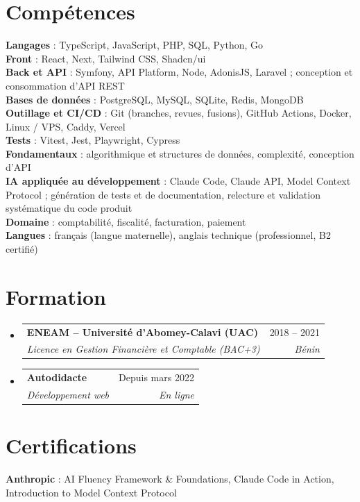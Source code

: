 \documentclass[a4paper,11pt]{article}
\makeatletter
\newlength{\entrygap}
\newlength{\headgap}
\newcommand{\resumeSubheading}[4]{
    \vspace{\entrygap}\item
    \begin{tabular*}{0.97\textwidth}[t]{l@{\extracolsep{\fill}}r}
        \textbf{#1} & #2 \\
        \textit{\small#3} & \textit{\small #4} \\
    \end{tabular*}\vspace{\headgap}
}
\newcommand{\resumeSubHeadingListStart}{\begin{itemize}[leftmargin=0.15in, label={}]}
\newcommand{\resumeSubHeadingListEnd}{\end{itemize}}
\makeatother
\begin{document}
\section{Compétences}
\begin{itemize}[leftmargin=0.15in, label={}]
    \small{\item{
        \textbf{Langages}{ : TypeScript, JavaScript, PHP, SQL, Python, Go} \\
        \textbf{Front}{ : React, Next, Tailwind CSS, Shadcn/ui} \\
        \textbf{Back et API}{ : Symfony, API Platform, Node, AdonisJS, Laravel ; conception et consommation d'API REST} \\
        \textbf{Bases de données}{ : PostgreSQL, MySQL, SQLite, Redis, MongoDB} \\
        \textbf{Outillage et CI/CD}{ : Git (branches, revues, fusions), GitHub Actions, Docker, Linux / VPS, Caddy, Vercel} \\
        \textbf{Tests}{ : Vitest, Jest, Playwright, Cypress} \\
        \textbf{Fondamentaux}{ : algorithmique et structures de données, complexité, conception d'API} \\
        \textbf{IA appliquée au développement}{ : Claude Code, Claude API, Model Context Protocol ; génération de tests et de documentation, relecture et validation systématique du code produit} \\
        \textbf{Domaine}{ : comptabilité, fiscalité, facturation, paiement} \\
        \textbf{Langues}{ : français (langue maternelle), anglais technique (professionnel, B2 certifié)}
    }}
\end{itemize}

\section{Formation}
\resumeSubHeadingListStart
    \resumeSubheading
        {ENEAM -- Université d'Abomey-Calavi (UAC)}{2018 -- 2021}
        {Licence en Gestion Financière et Comptable (BAC+3)}{Bénin}
    \resumeSubheading
        {Autodidacte}{Depuis mars 2022}
        {Développement web}{En ligne}
\resumeSubHeadingListEnd

\section{Certifications}
\begin{itemize}[leftmargin=0.15in, label={}]
    \small{\item{
        \textbf{Anthropic}{ : AI Fluency Framework \& Foundations, Claude Code in Action, Introduction to Model Context Protocol}
    }}
\end{itemize}

\end{document}

